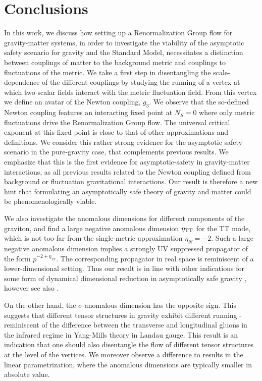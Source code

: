 \documentclass[twocolumn,prd,superscriptaddress,preprintnumbers,amsmath,amssymb,nofootinbib]{revtex4}
\begin{document}
%
\section{Conclusions}
%
In this work, we discuss how setting up a Renormalization Group flow for gravity-matter systems, in order to investigate the viability of the asymptotic safety scenario for gravity and the Standard Model, necessitates a distinction between couplings of matter to the background metric and couplings to fluctuations of the metric. We take a first step in disentangling the scale-dependence of the different couplings by studying the running of a vertex at which two scalar fields interact with the metric fluctuation field. From this vertex we define an avatar of the Newton coupling, $g_3$.
We observe that the so-defined Newton coupling features an interacting fixed point at $N_S=0$ where only metric fluctuations drive the Renormalization Group flow. The universal critical exponent at this fixed point is close to that of other approximations and definitions. We consider this rather strong evidence for the asymptotic safety scenario  in the pure-gravity case, that complements previous results. We emphasize that this is the first evidence for asymptotic-safety in gravity-matter interactions, as all previous results related to the Newton coupling defined from background or fluctuation gravitational interactions. Our result is therefore a new hint that formulating an asymptotically safe theory of gravity and matter could be phenomenologically viable.\newline

We also investigate the anomalous dimensions for different components of the graviton, and find a large negative anomalous dimension $\eta_{\rm TT}$ for the TT mode, which is not too far from the single-metric approximation $\eta_N=-2$.  Such a large negative anomalous dimension implies a strongly UV suppressed propagator of the form 
$p^{-2+\eta_{TT}}$. The corresponding propagator in real space is reminiscent of a lower-dimensional setting. Thus our result is in line with other indications for some form of dynamical dimensional reduction in asymptotically safe gravity   \cite{Lauscher:2001ya, Lauscher:2005qz,Reuter:2011ah,Rechenberger:2012pm,Calcagni:2013vsa}, however see also \cite{D'Odorico:2015lhd}.

On the other hand, the  $\sigma$-anomalous dimension has the opposite sign. This suggests that different tensor structures in gravity exhibit different running - reminiscent of the difference between the transverse and longitudinal gluons in the infrared regime in Yang-Mills theory in Landau gauge. 
This result is an indication that one should also disentangle the flow of different tensor structures at the level of the vertices.
We moreover observe a difference to results in the linear parametrization, where the anomalous dimensions are typically smaller in  absolute value.
\end{document}
